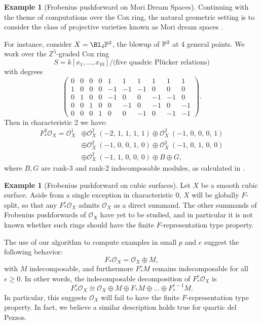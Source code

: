 \documentclass[12pt]{article}
\def\OO{\mathcal O}
\def\ZZ{\mathbb Z}
\theoremstyle{theorem}
\numberwithin{thm}{section}
\theoremstyle{definition}
\newtheorem{exa}[thm]{Example}
\begin{document}
\begin{exa}[Frobenius pushforward on Mori Dream Spaces]
  Continuing with the theme of computations over the Cox ring, the natural geometric setting is to consider the class of projective varieties known as Mori dream spaces \cite{HK00}.

  For instance, consider $X = \Bl_4\P^2$, the blowup of $\P^2$ at 4 general points. We work over the $\ZZ^5$-graded Cox ring
  \[ S = k[x_1,\dots,x_{10}]/\text{(five quadric Pl\"ucker relations)} \]
  with degrees
  \[
  \left(\!\begin{array}{rrrrrrrrrr}
  0&0&0&0&1&1&1&1&1&1 \\
  1&0&0&0&-1&-1&-1&0&0&0 \\
  0&1&0&0&-1&0&0&-1&-1&0 \\
  0&0&1&0&0&-1&0&-1&0&-1 \\
  0&0&0&1&0&0&-1&0&-1&-1
  \end{array}\!\right).
  \]
  Then in characteristic 2 we have:
  \begin{align*}
    F_*^2\OO_X = {\OO_{X}^{1}}
    &\oplus {\OO_{X}^{2}\ \left(-2,\,1,\,1,\,1,\,1\right)} \oplus {\OO_{X}^{2}\ \left(-1,\,0,\,0,\,0,\,1\right)} \\
    &\oplus {\OO_{X}^{2}\ \left(-1,\,0,\,0,\,1,\,0\right)} \oplus {\OO_{X}^{2}\ \left(-1,\,0,\,1,\,0,\,0\right)} \\
    &\oplus {\OO_{X}^{2}\ \left(-1,\,1,\,0,\,0,\,0\right)} \oplus B \oplus G,
  \end{align*}
  where $B, G$ are rank-3 and rank-2 indecomposable modules, as calculated in \cite{Hara15}.
\end{exa}

\begin{exa}[Frobenius pushforward on cubic surfaces]
  Let $X$ be a smooth cubic surface. Aside from a single exception in characteristic 0, $X$ will be globally $F$-split, so that any $F^e_*\OO_X $ admits $\OO_X$ as a direct summand.
  The other summands of Frobenius pushforwards of $\OO_X$ have yet to be studied, and in particular it is not known whether such rings should have the finite $F$-representation type property.

  The use of our algorithm to compute examples in small $p$ and $e$ suggest the following behavior:
  $$ F_* \OO_X = \OO_X\oplus M, $$
  with $M$ indecomposable, and furthermore $F_*^e M$ remains indecomposable for all $e\geq 0$. In other words, the indecomposable decomposition of $F^e_* \OO_X$ is
  $$ F_*^e \OO_X \cong \OO_X\oplus M\oplus F_* M\oplus\dots\oplus F_*^{e-1}M. $$
  In particular, this suggests $\OO_X$ will fail to have the finite $F$-representation type property.
  In fact, we believe a similar description holds true for quartic del Pezzos.
\end{exa}
\end{document}
